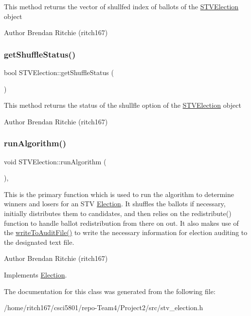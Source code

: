 This method returns the vector of shullfed index of ballots of the \hyperlink{classSTVElection}{S\+T\+V\+Election} object \begin{DoxyAuthor}{Author}
Brendan Ritchie (ritch167) 
\end{DoxyAuthor}
\mbox{\label{classSTVElection_aa8597739fd9823bbe8ea5a7fdb741f53}} 
\subsubsection{\texorpdfstring{get\+Shuffle\+Status()}{getShuffleStatus()}}
{\footnotesize\ttfamily bool S\+T\+V\+Election\+::get\+Shuffle\+Status (\begin{DoxyParamCaption}{ }\end{DoxyParamCaption})}

This method returns the status of the shullfle option of the \hyperlink{classSTVElection}{S\+T\+V\+Election} object \begin{DoxyAuthor}{Author}
Brendan Ritchie (ritch167) 
\end{DoxyAuthor}
\mbox{\label{classSTVElection_ac4e0339e3cb97add1a22c9af7233df17}} 
\subsubsection{\texorpdfstring{run\+Algorithm()}{runAlgorithm()}}
{\footnotesize\ttfamily void S\+T\+V\+Election\+::run\+Algorithm (\begin{DoxyParamCaption}{ }\end{DoxyParamCaption})\hspace{0.3cm}{\ttfamily [override]}, {\ttfamily [virtual]}}

This is the primary function which is used to run the algorithm to determine winners and losers for an S\+TV \hyperlink{classElection}{Election}. It shuffles the ballots if necessary, initially distributes them to candidates, and then relies on the redistribute() function to handle ballot redistribution from there on out. It also makes use of the \hyperlink{classElection_abd52b6c894a9f2a0a0a104e9f290f9a7}{write\+To\+Audit\+File()} to write the necessary information for election auditing to the designated text file. \begin{DoxyAuthor}{Author}
Brendan Ritchie (ritch167) 
\end{DoxyAuthor}


Implements \hyperlink{classElection_a059659576ebb0416ecd8005f684461d6}{Election}.



The documentation for this class was generated from the following file\+:\begin{DoxyCompactItemize}
\item 
/home/ritch167/csci5801/repo-\/\+Team4/\+Project2/src/stv\+\_\+election.\+h\end{DoxyCompactItemize}
